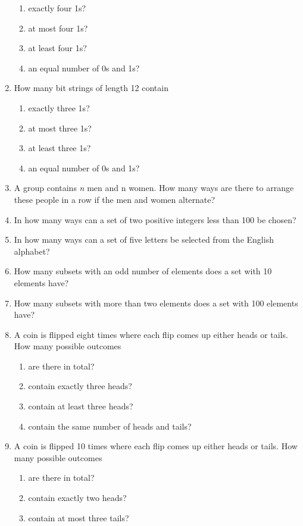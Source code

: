 \documentclass[11pt,a4paper]{book}
\begin{document}
\begin{enumerate}
\begin{enumerate}[label=(\alph*)]
\item exactly four 1s?
\item at most four 1s?
\item at least four 1s?
\item an equal number of 0s and 1s?
\end{enumerate}
\item How many bit strings of length 12 contain
\begin{enumerate}[label=(\alph*)]
\item exactly three 1s?
\item at most three 1s?
\item at least three 1s?
\item an equal number of 0s and 1s?
\end{enumerate}
\item A group contains \emph{n} men and n women.
How many ways are there to arrange these people in a row if the men and women alternate?
\item In how many ways can a set of two positive integers less than 100 be chosen?
\item In how many ways can a set of five letters be selected from the English alphabet?
\item How many subsets with an odd number of elements does a set with 10 elements have?
\item How many subsets with more than two elements does a set with 100 elements have?
\item A coin is flipped eight times where each flip comes up either heads or tails. How many possible outcomes
\begin{enumerate}[label=(\alph*)]
\item are there in total?
\item contain exactly three heads?
\item contain at least three heads?
\item contain the same number of heads and tails?
\end{enumerate}
\item A coin is flipped 10 times where each flip comes up either heads or tails.
How many possible outcomes
\begin{enumerate}[label=(\alph*)]
\item are there in total?
\item contain exactly two heads?
\item contain at most three tails?

\end{enumerate}
\end{enumerate}
\end{document}
